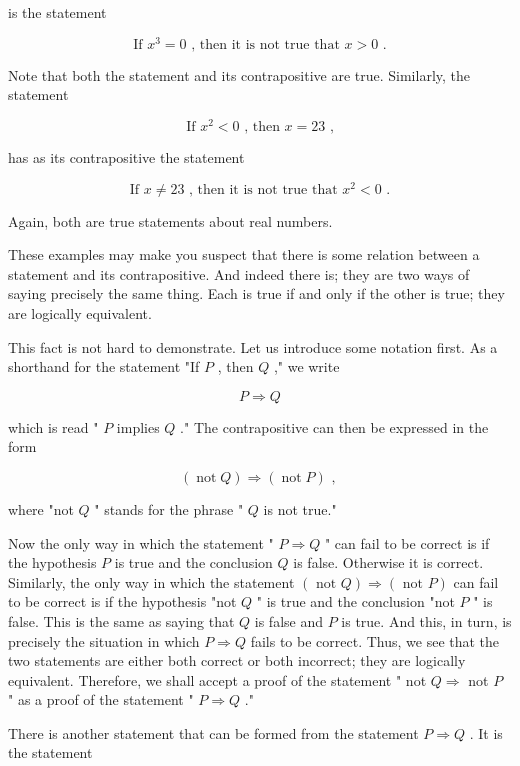 is the statement

\[
\text{ If }{x}^{3} = 0\text{ , then it is not true that }x > 0\text{ . }
\]

Note that both the statement and its contrapositive are true. Similarly, the statement

\[
\text{ If }{x}^{2} < 0\text{ , then }x = {23}\text{ , }
\]

has as its contrapositive the statement

\[
\text{ If }x \neq  {23}\text{ , then it is not true that }{x}^{2} < 0\text{ . }
\]

Again, both are true statements about real numbers.

These examples may make you suspect that there is some relation between a statement and its contrapositive. And indeed there is; they are two ways of saying precisely the same thing. Each is true if and only if the other is true; they are logically equivalent.

This fact is not hard to demonstrate. Let us introduce some notation first. As a shorthand for the statement "If \(P\) , then \(Q\) ," we write

\[
P \Rightarrow  Q
\]

which is read " \(P\) implies \(Q\) ." The contrapositive can then be expressed in the form

\[
\left( {\operatorname{not}Q}\right)  \Rightarrow  \left( {\operatorname{not}P}\right) \text{ , }
\]

where "not \(Q\) " stands for the phrase " \(Q\) is not true."

Now the only way in which the statement " \(P \Rightarrow  Q\) " can fail to be correct is if the hypothesis \(P\) is true and the conclusion \(Q\) is false. Otherwise it is correct. Similarly, the only way in which the statement \(\left( {\text{ not }Q}\right)  \Rightarrow  \left( {\text{ not }P}\right)\) can fail to be correct is if the hypothesis "not \(Q\) " is true and the conclusion "not \(P\) " is false. This is the same as saying that \(Q\) is false and \(P\) is true. And this, in turn, is precisely the situation in which \(P \Rightarrow  Q\) fails to be correct. Thus, we see that the two statements are either both correct or both incorrect; they are logically equivalent. Therefore, we shall accept a proof of the statement " not \(Q \Rightarrow\) not \(P\) " as a proof of the statement " \(P \Rightarrow  Q\) ."

There is another statement that can be formed from the statement \(P \Rightarrow  Q\) . It is the statement

